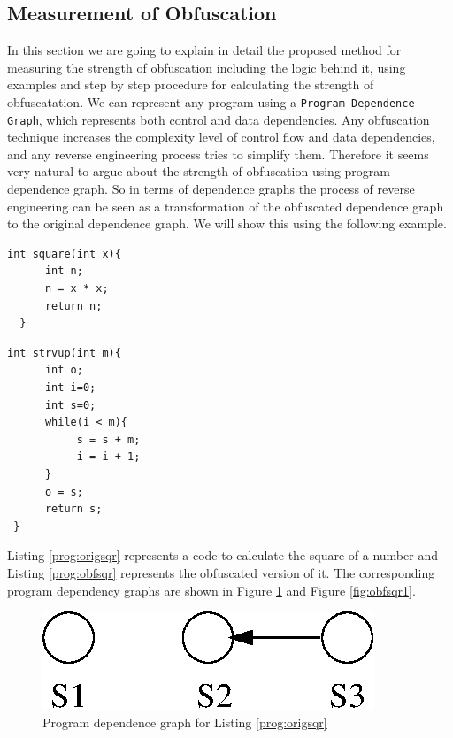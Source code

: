 \documentclass[twocolumn]{article}
\begin{document}
\subsection{Measurement of Obfuscation}
In this section we are going to explain in detail the proposed method for measuring the strength of obfuscation including the logic behind it, using examples and step by step procedure 
for calculating the strength of obfuscatation. We can represent any program using a {\tt Program Dependence Graph}, which represents both control and data dependencies. Any obfuscation 
technique increases the complexity level of control flow and data dependencies, and any reverse engineering process tries to simplify them. Therefore it seems very natural to argue about 
the strength of obfuscation using program dependence graph. So in terms of dependence graphs the process of reverse engineering can be seen as a transformation of the obfuscated dependence 
graph to the original dependence graph. We will show this using the following example.
\tiny\begin{lstlisting}[frame=single]
 int square(int x){
	  int n;
	  n = x * x;
	  return n;
  }
\end{lstlisting}
\normalsize
{}
\tiny\begin{lstlisting}[frame=single]
 int strvup(int m){
	  int o;
	  int i=0;
	  int s=0;
	  while(i < m){
		   s = s + m;
		   i = i + 1;
	  }
	  o = s;
	  return s;
 }
\end{lstlisting}
\normalsize
Listing \ref{prog:origsqr} represents a code to calculate the square of a number and Listing \ref{prog:obfsqr} represents the obfuscated version of it. The corresponding program dependency 
graphs are shown in Figure \ref{fig:origsqr} and Figure \ref{fig:obfsqr1}.
\begin{figure}[h]
 \centering
 \includegraphics[scale=0.3]{./origdep.eps}
 \caption{Program dependence graph for Listing \ref{prog:origsqr}}
 \label{fig:origsqr}
\end{figure}
\end{document}
